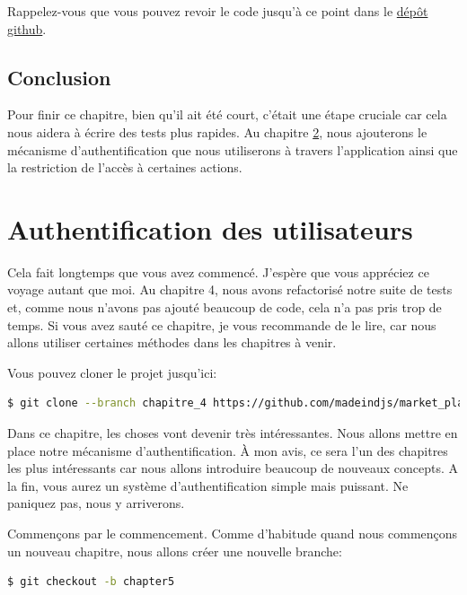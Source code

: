 \documentclass[]{report}
\begin{document}
    Rappelez-vous que vous pouvez revoir le code jusqu'à ce point dans le \href{https://github.com/madeindjs/market_place_api}{dépôt github}.

  \section{Conclusion}

    Pour finir ce chapitre, bien qu'il ait été court, c'était une étape cruciale car cela nous aidera à écrire des tests plus rapides. Au chapitre \ref{chapter:5}, nous ajouterons le mécanisme d'authentification que nous utiliserons à travers l'application ainsi que la restriction de l'accès à certaines actions.

\chapter{Authentification des utilisateurs}\label{chapter:5}

  Cela fait longtemps que vous avez commencé. J'espère que vous appréciez ce voyage autant que moi. Au chapitre 4, nous avons refactorisé notre suite de tests et, comme nous n'avons pas ajouté beaucoup de code, cela n'a pas pris trop de temps. Si vous avez sauté ce chapitre, je vous recommande de le lire, car nous allons utiliser certaines méthodes dans les chapitres à venir.

  Vous pouvez cloner le projet jusqu'ici:

  \begin{scriptsize}
    \begin{lstlisting}[language=bash]
    $ git clone --branch chapitre_4 https://github.com/madeindjs/market_place_api
    \end{lstlisting}
  \end{scriptsize}

  Dans ce chapitre, les choses vont devenir très intéressantes. Nous allons mettre en place notre mécanisme d'authentification. À mon avis, ce sera l'un des chapitres les plus intéressants car nous allons introduire beaucoup de nouveaux concepts. A la fin, vous aurez un système d'authentification simple mais puissant. Ne paniquez pas, nous y arriverons.

  Commençons par le commencement. Comme d'habitude quand nous commençons un nouveau chapitre, nous allons créer une nouvelle branche:

  \begin{scriptsize}
    \begin{lstlisting}[language=bash]
    $ git checkout -b chapter5
    \end{lstlisting}
  \end{scriptsize}
\end{document}
